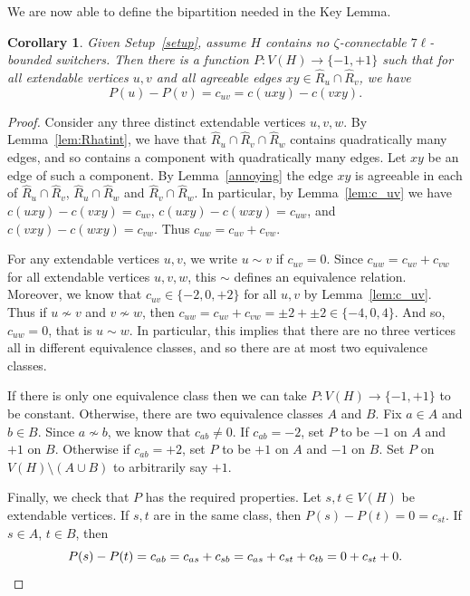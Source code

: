 \documentclass[A4paper,12pt]{article}
\newtheorem{cor}[thm]{Corollary}
\theoremstyle{definition}
\begin{document}
We are now able to define the bipartition needed in the Key Lemma.
\begin{cor}\label{cor:c(uxy) - c(vxy)}
Given Setup~\ref{setup}, assume $H$ contains no $\zeta$-connectable $7\ell$-bounded switchers. Then there is a function $P:V(H) \rightarrow \{-1,+1\}$ such that for all extendable vertices $u,v$ and all agreeable edges $xy \in \hat{R}_u \cap \hat{R}_v$, we have
\[P(u) - P(v) =c_{uv} =  c(uxy) - c(vxy).\]
\end{cor}
\begin{proof} 
Consider any three distinct extendable vertices $u,v,w$. By Lemma~\ref{lem:Rhatint}, we have that $\hat{R}_u \cap \hat{R}_v \cap \hat{R}_w$ contains quadratically many edges, and so contains a component with quadratically many edges.
Let $xy$ be an edge of such a component. By Lemma~\ref{annoying} the edge $xy$ is agreeable in each of $\hat{R}_u \cap \hat{R}_v$, $\hat{R}_u \cap \hat{R}_w$ and $\hat{R}_v \cap \hat{R}_w$. 
In particular, by Lemma~\ref{lem:c_uv} we have $c(uxy) - c(vxy) = c_{uv}$, $c(uxy) - c(wxy) = c_{uw}$, and  $c(vxy) - c(wxy) = c_{vw}$. Thus $c_{uw} = c_{uv} + c_{vw}$.

For any extendable vertices $u,v$, we write $u\sim v$ if $c_{uv} = 0$. Since $c_{uw} = c_{uv} + c_{vw}$ for all extendable vertices $u,v,w$, this $\sim$ defines an equivalence relation. Moreover, we know that $c_{uv} \in \{-2,0,+2\}$ for all $u,v$ by Lemma~\ref{lem:c_uv}. Thus if $u \not \sim v$ and $v \not \sim w$, then $c_{uw} = c_{uv} + c_{vw} = \pm2 + \pm 2 \in \{-4,0,4\}$. And so, $c_{uw} = 0$, that is $u \sim w$. In particular, this implies that there are no three vertices all in different equivalence classes, and so there are at most two equivalence classes. 

If there is only one equivalence class then we can take  $P: V(H) \rightarrow \{-1,+1\}$ to be constant. Otherwise, there are two equivalence classes $A$ and $B$. Fix $a\in A$ and $b \in B$. Since $a \not\sim b$, we know that $c_{ab} \ne 0$. 
If $c_{ab} = -2$, set $P$ to be $-1$ on $A$ and $+1$ on $B$. Otherwise if $c_{ab} = +2$, set $P$ to be $+1$ on $A$ and $-1$ on $B$. Set $P$ on $V(H)\setminus (A \cup B)$ to arbitrarily say $+1$.



Finally, we check that $P$ has the required properties. Let $s,t \in V(H)$ be extendable vertices. If $s,t$ are in the same class, then $P(s) - P(t) = 0 = c_{st}$. If $s\in A$, $t \in B$, then \[P(s) - P(t) = c_{ab} = c_{as} + c_{sb} = c_{as} + c_{st} + c_{tb} = 0 + c_{st} + 0. \qedhere \]
\end{proof}
\end{document}
